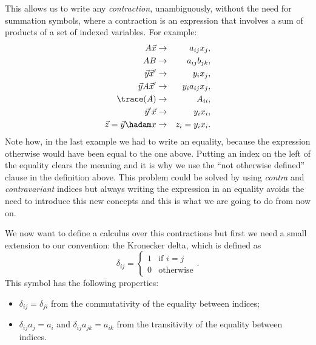 \documentclass{article}
\begin{document}
This allows us to write any \emph{contraction}, unambiguously, without the need
for summation symbols, where a contraction is an expression that involves a sum
of products of a set of indexed variables. For example:
\begin{eqnarray*}
A \vec x &\rightarrow& a_{ij} x_j, \\
A B &\rightarrow& a_{ij} b_{jk}, \\
\vec y \vec x' &\rightarrow& y_i x_j, \\
\vec y A \vec x' &\rightarrow& y_i a_{ij} x_j, \\
\trace(A) &\rightarrow& A_{ii}, \\
\vec y' \vec x &\rightarrow& y_i x_i, \\
\vec z = \vec y \hadam x &\rightarrow& z_i = y_i x_i.
\end{eqnarray*}
Note how, in the last example we had to write an equality, because the
expression otherwise would have been equal to the one above. Putting an index on
the left of the equality clears the meaning and it is why we use
the ``not otherwise defined'' clause in the definition above. This problem could
be solved by using \emph{contra} and \emph{contravariant} indices but always
writing the expression in an equality avoids the need to introduce this new
concepts and this is what we are going to do from now on.

We now want to define a calculus over this contractions but first we need a
small extension to our convention: the Kronecker delta, which is defined as
\[
\delta_{ij} = \left\{\begin{array}{ll}
                     1 & \mbox{if \(i = j\)} \\
                     0 & \mbox{otherwise}
                     \end{array}\right..
\] This symbol has the following properties:
\begin{itemize}
\item \(\delta_{ij} = \delta_{ji}\) from the commutativity of the equality
between indices;
\item \(\delta_{ij} a_j = a_i\) and \(\delta_{ij} a_{jk} = a_{ik}\) from the
transitivity of the equality between indices.
\end{itemize}
\end{document}
